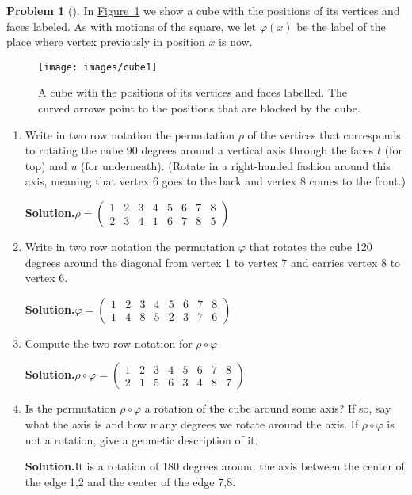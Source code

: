 \documentclass[10pt,]{book}
\theoremstyle{plain}
\theoremstyle{definition}
\newtheorem{activity}[project]{Problem}
\theoremstyle{definition}
\numberwithin{equation}{chapter}
\newcommand{\amp}{&}
\begin{document}
\begin{activity}[]\label{cube1-prob}
In \hyperref[cube1]{Figure~\ref{cube1}} we show a cube with the positions of its vertices and faces labeled.  As with motions of the square, we let \(\varphi(x)\) be the label of the place where vertex previously in position \(x\) is now.%
\begin{figure}
\centering
\texttt{[image: images/cube1]}
\caption{A cube with the positions of its vertices and faces labelled.  The curved arrows point to the positions that are blocked by the cube.\label{cube1}}
\end{figure}
\begin{enumerate}[font=\bfseries,label=(\alph*),ref=\alph*]
\item\label{task-189} Write in two row notation the permutation \(\rho\) of the vertices that corresponds to rotating the cube 90 degrees around a vertical axis through the faces \(t\) (for top) and \(u\) (for underneath). (Rotate in a right-handed fashion around this axis, meaning that vertex 6 goes to the back and vertex 8 comes to the front.)%
\par\medskip\noindent%
\textbf{Solution.}\quad \(\rho = \begin{pmatrix}1 \amp 2 \amp 3 \amp 4 \amp 5 \amp 6 \amp 7 \amp 8 \\ 2 \amp 3 \amp 4 \amp 1 \amp 6 \amp 7 \amp 8 \amp 5 \end{pmatrix}\)%
\item\label{task-190} Write in two row notation the permutation \(\varphi\) that rotates the cube 120 degrees around the diagonal from vertex 1 to vertex 7 and carries vertex 8 to vertex 6.%
\par\medskip\noindent%
\textbf{Solution.}\quad \(\varphi = \begin{pmatrix}1 \amp 2 \amp 3 \amp 4 \amp 5 \amp 6 \amp 7 \amp 8 \\
1 \amp 4 \amp 8 \amp 5 \amp 2 \amp 3 \amp 7 \amp 6 \end{pmatrix}\)%
\item\label{task-191} Compute the two row notation for \(\rho \circ \varphi\)%
\par\medskip\noindent%
\textbf{Solution.}\quad \(\rho \circ \varphi = \begin{pmatrix}
1 \amp 2 \amp 3 \amp 4 \amp 5 \amp 6 \amp 7 \amp 8 \\
2 \amp 1 \amp 5 \amp 6 \amp 3 \amp 4 \amp 8 \amp 7 \end{pmatrix}\)%
\item\label{task-192} Is the permutation \(\rho\circ\varphi\) a rotation of the cube around some axis?  If so, say what the axis is and how many degrees we rotate around the axis.  If \(\rho\circ\varphi\) is not a rotation, give a geometic description of it.%
\par\medskip\noindent%
\textbf{Solution.}\quad It is a rotation of 180 degrees around the axis between the center of the edge 1,2 and the center of the edge 7,8.%
\end{enumerate}
\end{activity}
\end{document}
